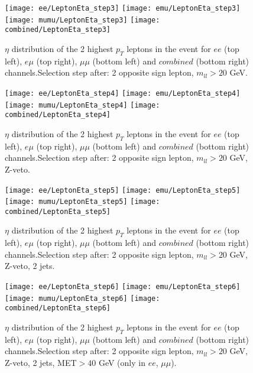 \documentclass[12pt, a4paper, titlepage]{article}
\begin{document}
\clearpage
\newpage

\begin{figure}
  \texttt{[image: ee/LeptonEta\_step3]}
  \texttt{[image: emu/LeptonEta\_step3]}\\
  \texttt{[image: mumu/LeptonEta\_step3]}
  \texttt{[image: combined/LeptonEta\_step3]}
\caption{$\eta$ distribution of the 2 highest $p_T$ leptons in the event for $ee$ (top left), $e\mu$ (top right), $\mu\mu$ (bottom left) and $combined$ (bottom right) channels.\newline Selection step after: 2 opposite sign lepton, $m_{ll}>20$ GeV.}
\end{figure}

\clearpage
\newpage


\begin{figure}
  \texttt{[image: ee/LeptonEta\_step4]}
  \texttt{[image: emu/LeptonEta\_step4]}\\
  \texttt{[image: mumu/LeptonEta\_step4]}
  \texttt{[image: combined/LeptonEta\_step4]}
\caption{$\eta$ distribution of the 2 highest $p_T$ leptons in the event for $ee$ (top left), $e\mu$ (top right), $\mu\mu$ (bottom left) and $combined$ (bottom right) channels.\newline Selection step after: 2 opposite sign lepton, $m_{ll}>20$ GeV, Z-veto.}
\end{figure}

\clearpage
\newpage


\begin{figure}
  \texttt{[image: ee/LeptonEta\_step5]}
  \texttt{[image: emu/LeptonEta\_step5]}\\
  \texttt{[image: mumu/LeptonEta\_step5]}
  \texttt{[image: combined/LeptonEta\_step5]}
\caption{$\eta$ distribution of the 2 highest $p_T$ leptons in the event for $ee$ (top left), $e\mu$ (top right), $\mu\mu$ (bottom left) and $combined$ (bottom right) channels.\newline Selection step after: 2 opposite sign lepton, $m_{ll}>20$ GeV, Z-veto, 2 jets.}
\end{figure}

\clearpage
\newpage


\begin{figure}
  \texttt{[image: ee/LeptonEta\_step6]}
  \texttt{[image: emu/LeptonEta\_step6]}\\
  \texttt{[image: mumu/LeptonEta\_step6]}
  \texttt{[image: combined/LeptonEta\_step6]}
\caption{$\eta$ distribution of the 2 highest $p_T$ leptons in the event for $ee$ (top left), $e\mu$ (top right), $\mu\mu$ (bottom left) and $combined$ (bottom right) channels.\newline Selection step after: 2 opposite sign lepton, $m_{ll}>20$ GeV, Z-veto, 2 jets, MET$>40$ GeV (only in $ee$, $\mu\mu$).}
\end{figure}
\end{document}
